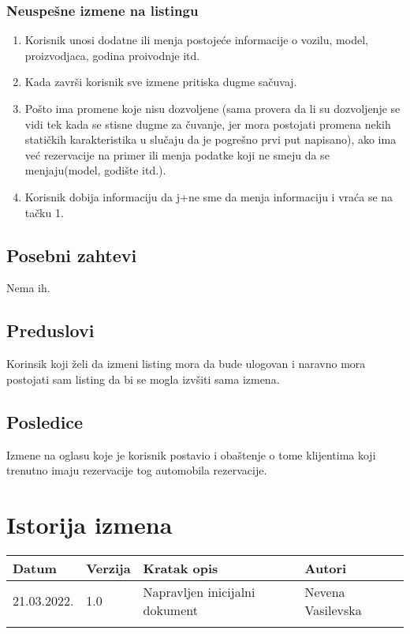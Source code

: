 \documentclass[12pt]{article}
\begin{document}
\subsubsection{Neuspešne izmene na listingu}
\begin{enumerate}
    \item Korisnik unosi dodatne ili menja postojeće informacije o vozilu, model, proizvodjaca, godina proivodnje itd.
    \item Kada završi korisnik sve izmene pritiska dugme sačuvaj.
    \item Pošto ima promene koje nisu dozvoljene (sama provera da li su dozvoljenje se vidi tek kada se stisne dugme za čuvanje, jer mora postojati promena nekih statičkih karakteristika u slučaju da je pogrešno prvi put napisano), ako ima već rezervacije na primer ili menja podatke koji ne smeju da se menjaju(model, godište itd.).
    \item Korisnik dobija informaciju da j+ne sme da menja informaciju i vraća se na tačku 1.
\end{enumerate}

\subsection{Posebni zahtevi}
Nema ih.
\subsection{Preduslovi}
Korinsik koji želi da izmeni listing mora da bude ulogovan i naravno mora postojati sam listing da bi se mogla izvšiti sama izmena.
\subsection{Posledice}
Izmene na oglasu koje je korisnik postavio i obaštenje o tome klijentima koji trenutno imaju rezervacije tog automobila rezervacije.

\section{Istorija izmena}
\begin{center}
\begin{tabular}{ | m{2cm} | m{1.5cm}| m{6cm} | m{5cm} | } 
\hline
Datum & Verzija & Kratak opis & Autori \\ 
\hline
 21.03.2022. & 1.0 & Napravljen inicijalni dokument & Nevena Vasilevska\\ 
\hline
&&&\\ 
\hline
\end{tabular}
\end{center}
\end{document}
